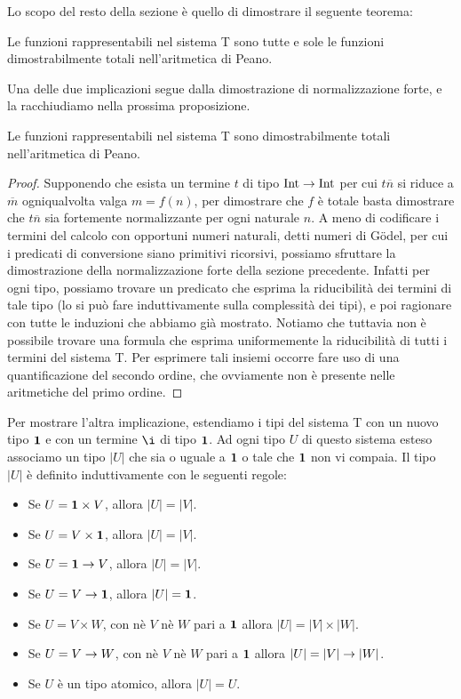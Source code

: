 \documentclass[]{marticle}
\begin{document}
Lo scopo del resto della sezione \`e quello di dimostrare il seguente teorema:

\begin{block}[Teorema]
    Le funzioni rappresentabili nel sistema T sono tutte e sole le funzioni
    dimostrabilmente totali nell'aritmetica di Peano.
\end{block}

Una delle due implicazioni segue dalla dimostrazione di normalizzazione forte, e
la racchiudiamo nella prossima proposizione.

\begin{block}[Proposizione]
    Le funzioni rappresentabili nel sistema T sono dimostrabilmente totali
    nell'aritmetica di Peano.
\end{block}
\begin{proof}
    Supponendo che esista un termine $t$ di tipo $\text{Int}\rightarrow\text{Int}$ per cui
    $t\overline{n}$ si riduce a $\overline{m}$ ogniqualvolta valga $m = f(n)$,
    per dimostrare che $f$ \`e totale basta dimostrare che $t\overline{n}$ sia
    fortemente normalizzante per ogni naturale $n$. A meno di codificare i
    termini del calcolo con opportuni numeri naturali, detti numeri di G\"odel,
    per cui i predicati di conversione siano primitivi ricorsivi, possiamo
    sfruttare la dimostrazione della normalizzazione forte della sezione
    precedente. Infatti per ogni tipo, possiamo trovare un predicato che esprima
    la riducibilit\`a dei termini di tale tipo (lo si pu\`o fare induttivamente
    sulla complessit\`a dei tipi), e poi ragionare con tutte le induzioni che
    abbiamo gi\`a mostrato. Notiamo che tuttavia non \`e possibile trovare una
    formula che esprima uniformemente la riducibilit\`a di tutti i termini del
    sistema T. Per esprimere tali insiemi occorre fare uso di una
    quantificazione del secondo ordine, che ovviamente non \`e presente nelle
    aritmetiche del primo ordine.
\end{proof}

Per mostrare l'altra implicazione, estendiamo i tipi del sistema T con un nuovo
tipo $\text{\textbf{1}}$ e con un termine $\i$ di tipo $\text{\textbf{1}}$. Ad ogni tipo $U$ di questo
sistema esteso associamo un tipo $|U|$ che sia o uguale a $\text{\textbf{1}}$ o tale che
$\text{\textbf{1}}$ non vi compaia. Il tipo $|U|$ \`e definito induttivamente con le seguenti
regole:
\begin{itemize}
    \item Se $U= \text{\textbf{1}} \times V$, allora $|U|=|V|$.
    \item Se $U= V \times \text{\textbf{1}}$, allora $|U|=|V|$.
    \item Se $U= \text{\textbf{1}} \rightarrow V$, allora $|U|=|V|$.
    \item Se $U= V \rightarrow \text{\textbf{1}}$, allora $|U|=\text{\textbf{1}}$.
    \item Se $U=V\times W$, con n\`e $V$ n\`e $W$ pari a $\text{\textbf{1}}$ allora $|U|=|V|
        \times |W|$.
    \item Se $U=V\rightarrow W$, con n\`e $V$ n\`e $W$ pari a $\text{\textbf{1}}$ allora $|U|=|V|
        \rightarrow |W|$.
    \item Se $U$ \`e un tipo atomico, allora $|U|=U$.
\end{itemize}
\end{document}
